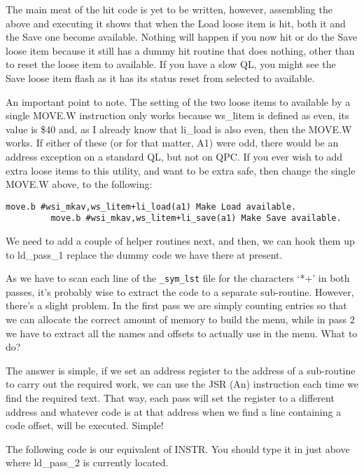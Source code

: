 The main meat of the hit code is yet to be written, however,
    assembling the above and executing it shows that when the Load loose
    item is hit, both it and the Save one become available. Nothing will
    happen if you now hit or do the Save loose item because it still has a
    dummy hit routine that does nothing, other than to reset the loose item to
    available. If you have a slow QL, you might see the Save loose item
    flash as it has its status reset from selected to available.

An important point to note. The setting of the two loose items to
    available by a single MOVE.W instruction only works because ws\_litem is
    defined as even, its value is \$40 and, as I already know that li\_load is
    also even, then the MOVE.W works. If either of these (or for that matter,
    A1) were odd, there would be an address exception on a standard QL, but
    not on QPC. If you ever wish to add extra loose items to this utility, and
    want to be extra safe, then change the single MOVE.W above, to the
    following:

\begin{lstlisting}[firstnumber=1,]
         move.b #wsi_mkav,ws_litem+li_load(a1) Make Load available.
         move.b #wsi_mkav,ws_litem+li_save(a1) Make Save available.
\end{lstlisting}

We need to add a couple of helper routines next, and then, we can
    hook them up to ld\_pass\_1 replace the dummy code we
    have there at present.

As we have to scan each line of the \nolinkurl{_sym_lst}     file for the characters `*+' in both passes, it's probably wise to extract
    the code to a separate sub-{}routine. However, there's a slight problem. In
    the first pass we are simply counting entries so that we can allocate the
    correct amount of memory to build the menu, while in pass 2 we have to
    extract all the names and offsets to actually use in the menu. What to
    do?

The answer is simple, if we set an address register to the address
    of a sub-{}routine to carry out the required work, we can use the JSR (An)
    instruction each time we find the required text. That way, each pass will
    set the register to a different address and whatever code is at that
    address when we find a line containing a code offset, will be executed.
    Simple!

The following code is our equivalent of INSTR. You should type it in
    just above where ld\_pass\_2 is currently
    located.

